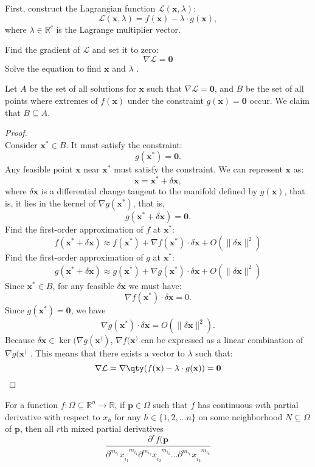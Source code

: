 \documentclass[a4paper,12pt]{report}
\begin{document}
{{{{{{{{{{{{First, construct the Lagrangian function \( \mathcal{L}(\mathbf{x},\lambda) \):
\[
\mathcal{L}(\mathbf{x},\lambda) = f(\mathbf{x}) - \lambda \cdot g(\mathbf{x}),
\]
where \( \lambda\in\mathbb{R}^c \) is the Lagrange multiplier vector.

Find the gradient of $\mathcal{L}$ and set it to zero:
\[
\nabla \mathcal{L} = \mathbf{0}
\]
Solve the equation to find \( \mathbf{x} \) and \( \lambda \) . 

 Let $A$ be the set of all solutions for \( \mathbf{x} \) such that $\nabla \mathcal{L} = \mathbf{0}$, and $B$ be the set of all points where extremes of \( f(\mathbf{x}) \) under the constraint \( g(\mathbf{x}) = \mathbf{0}\) occur. We claim that $B\subseteq A$.
\begin{proof}\mbox{}\\
Consider $\mathbf{x}^*\in B$. It must satisfy the constraint:
\[g(\mathbf{x}^*) = \mathbf{0}.\]
Any feasible point $\mathbf{x}$ near $\mathbf{x}^*$ must satisfy the constraint. We can represent $\mathbf{x}$ as:
\[\mathbf{x} = \mathbf{x}^* + \delta\mathbf{x},\]
where $\delta\mathbf{x}$ is a differential change tangent to the manifold defined by $g(\mathbf{x})$, that is, it lies in the kernel of $\nabla g(\mathbf{x}^*)$, that is,
\[g(\mathbf{x}^* + \delta\mathbf{x}) = \mathbf{0}.\]
Find the first-order approximation of $f$ at $\mathbf{x}^*$:
\[f(\mathbf{x}^*+ \delta\mathbf{x}) \approx f(\mathbf{x}^*) + \nabla f(\mathbf{x}^*) \cdot \delta\mathbf{x} + O(\|\delta\mathbf{x}\|^2)\]
Find the first-order approximation of $g$ at $\mathbf{x}^*$:
\[g(\mathbf{x}^*+ \delta\mathbf{x}) \approx g(\mathbf{x}^*) + \nabla g(\mathbf{x}^*) \cdot \delta\mathbf{x} + O(\|\delta\mathbf{x}\|^2)\]
Since $\mathbf{x}^*\in B$, for any feasible $\delta\mathbf{x}$ we must have:
\[\nabla f(\mathbf{x}^*) \cdot \delta\mathbf{x} = 0.\]
Since $g(\mathbf{x}^*) = \mathbf{0}$, we have
\[\nabla g(\mathbf{x}^*) \cdot \delta\mathbf{x} = O(\|\delta\mathbf{x}\|^2).\]
Because \( \delta\mathbf{x} \in \ker(\nabla g(\mathbf{x}^)) \), \( \nabla f(\mathbf{x}^) \) can be expressed as a linear combination of \( \nabla g(\mathbf{x}^) \) . This means that there exists a vector to $\lambda$ such that:
\[\nabla\mathcal{L} = \nabla \qty(f(\mathbf{x}) - \lambda \cdot g(\mathbf{x})) = \mathbf{0} \]
\end{proof}
For a function $f\colon\Omega\subseteq\mathbb{R}^n\to\mathbb{R}$, if $\mathbf{p}\in\Omega$ such that $f$ has continuous $m$th partial derivative with respect to $x_h$ for any $h\in\{1,2,\dots n\}$ on some neighborhood $N\subseteq\Omega$ of $\mathbf{p}$, then all $r$th mixed partial derivatives \[\frac{\partial^r f(\mathbf{p}}{\partial^{m_{i_1}}x_{i_1}^{\phantom{i_1}m_{i_1}}\partial^{m_{i_2}}x_{i_2}^{\phantom{i_2}m_{i_2}}\dots \partial^{m_{i_k}}x_{i_k}^{\phantom{i_k}m_{i_k}}}\]
}}}}}}}}}}}}
\end{document}
